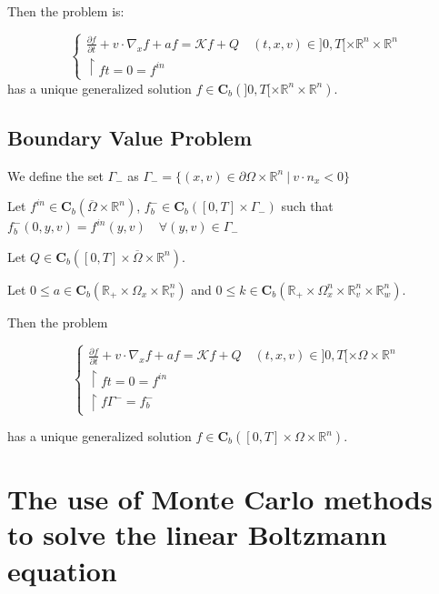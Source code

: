 \documentclass[a4paper, 11pt]{article}
\begin{document}
\paragraph{}

Then the problem is:

\[
\begin{cases}
	\frac{\partial f}{\partial t}+v \cdot \nabla_x f +af =   \mathcal{K} f +Q \quad (t,x,v) \in ]0,T[ \times \mathbb{R}^n \times \mathbb{R}^n\\
	\restriction{f}{t=0}= f^{in}
\end{cases}
\]
has a unique generalized solution $f \in \mathbf{C}_b(]0,T[ \times \mathbb{R}^n \times \mathbb{R}^n)$.

\subsection{Boundary Value Problem}

We define the set $\Gamma_-$ as $\Gamma_-= \{(x,v) \in \partial \Omega \times \mathbb{R}^n ~ | ~ v\cdot n_x<0\}$

Let $f^{in} \in \mathbf{C}_b(\overline{\Omega} \times \mathbb{R}^n)$, $f_b^- \in \mathbf{C}_b([0,T] \times \Gamma_-)$ such that $f_b^-(0,y,v)=f^{in}(y,v) \quad \forall (y,v) \in \Gamma_-$

Let $Q \in \mathbf{C}_b([0,T] \times \overline{\Omega} \times \mathbb{R}^n)$.

Let $0 \leq a \in \mathbf{C}_b(\mathbb{R}_+ \times \Omega_x \times \mathbb{R}_v^n)$ and $0 \leq k \in \mathbf{C}_b(\mathbb{R}_+ \times \Omega_x^n \times \mathbb{R}_v^n \times \mathbb{R}_w^n)$.

Then the problem

\[
\begin{cases}
	\frac{\partial f}{\partial t}+v \cdot \nabla_x f +af =   \mathcal{K} f +Q \quad (t,x,v) \in ]0,T[ \times \Omega \times \mathbb{R}^n\\
	\restriction{f}{t=0}= f^{in}\\
	\restriction{f}{\Gamma^-}=f_b^-
\end{cases}
\]

has a unique generalized solution $f \in \mathbf{C}_b([0,T] \times \Omega \times \mathbb{R}^n)$.

\section{The use of Monte Carlo methods to solve the linear Boltzmann equation}
\end{document}
